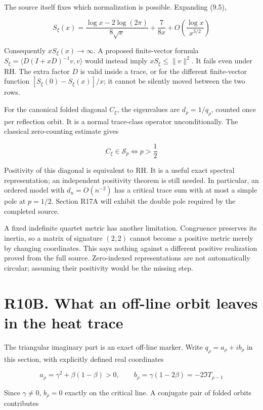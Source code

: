 \documentclass[
  11pt,
]{book}
\begin{document}
The source itself fixes which normalization is possible. Expanding
(9.5),

\[
\boxed{S_\xi(x)=
\frac{\log x-2\log(2\pi)}{8\sqrt x}
+\frac7{8x}
+O\!\left(\frac{\log x}{x^{3/2}}\right)}
\tag{OP.1}
\]

Consequently \(xS_\xi(x)\to\infty\). A proposed finite-vector formula
\(S_\xi=\langle D(I+xD)^{-1}v,v\rangle\) would instead imply
\(xS_\xi\le\|v\|^2\). It fails even under RH. The extra factor \(D\) is
valid inside a trace, or for the different finite-vector function
\([S_\xi(0)-S_\xi(x)]/x\); it cannot be silently moved between the two
rows.

For the canonical folded diagonal \(C_\xi\), the eigenvalues are
\(d_\rho=1/q_\rho\), counted once per reflection orbit. It is a normal
trace-class operator unconditionally. The classical zero-counting
estimate gives

\[
\boxed{C_\xi\in\mathcal S_p\iff p>\frac12}
\tag{OP.2}
\]

Positivity of this diagonal is equivalent to RH. It is a useful exact
spectral representation; an independent positivity theorem is still
needed. In particular, an ordered model with \(d_n=O(n^{-2})\) has a
critical trace sum with at most a simple pole at \(p=1/2\). Section R17A
will exhibit the double pole required by the completed source.

A fixed indefinite quartet metric has another limitation. Congruence
preserves its inertia, so a matrix of signature \((2,2)\) cannot become
a positive metric merely by changing coordinates. This says nothing
against a different positive realization proved from the full source.
Zero-indexed representations are not automatically circular; assuming
their positivity would be the missing step.

\section{R10B. What an off-line orbit leaves in the heat
trace}\label{r10b.-what-an-off-line-orbit-leaves-in-the-heat-trace}

The triangular imaginary part is an exact off-line marker. Write
\(q_\rho=a_\rho+ib_\rho\) in this section, with explicitly defined real
coordinates

\[
\boxed{a_\rho=\gamma^2+\beta(1-\beta)>0,\qquad
b_\rho=\gamma(1-2\beta)
=-2\Im T_{\rho-1}}
\tag{HT.1}
\]

Since \(\gamma\ne0\), \(b_\rho=0\) exactly on the critical line. A
conjugate pair of folded orbits contributes
\end{document}
